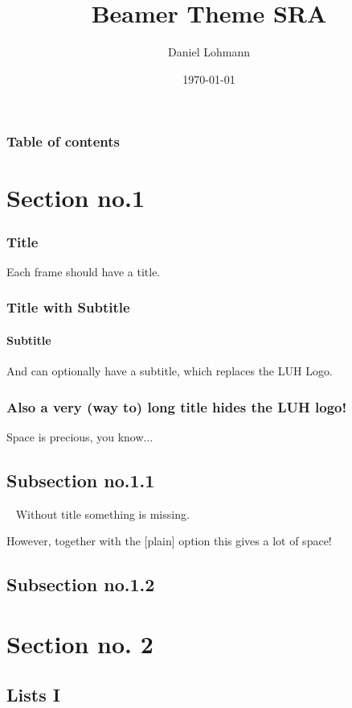 \documentclass{beamer}
\begin{document}
\title{Beamer Theme SRA}
\author[dl]{Daniel Lohmann}
\date{\today}

\begin{frame}[title]
	\titlepage
\end{frame}

\begin{frame}\frametitle{Table of contents}\tableofcontents
\end{frame}


\section{Section no.1}

\begin{frame}
	\frametitle{Title}
	Each frame should have a title.
\end{frame}

\begin{frame}
	\frametitle{Title with Subtitle}
	\framesubtitle{Subtitle}
	And can optionally have a subtitle, which replaces the LUH Logo.
\end{frame}

\begin{frame}
	\frametitle{Also a very (way to) long title hides the LUH logo!}
	Space is precious, you know...
\end{frame}

\subsection{Subsection no.1.1  }

\begin{frame}{~}
	Without title something is missing.
\end{frame}

\begin{frame}[plain]{}
	However, together with the [plain] option this gives a lot of space!
\end{frame}

\subsection{Subsection no.1.2}

\section{Section no. 2}

\subsection{Lists I}
\end{document}
